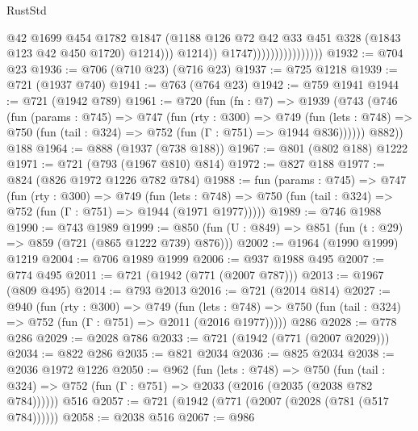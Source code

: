 \begin{lexlean}{RustStd}
\begin{coremodule}
{\begin{coremodule}
{{{{{{{{{{                                            @42
                                            @1699
                                            @454
                                            @1782
                                            @1847
                                            (@1188
                                              @126
                                              @72
                                              @42
                                              @33
                                              @451
                                              @328
                                              (@1843 @123 @42 @450 @1720)
                                              @1214)))
                                        @1214))
                                    @1747))))))))))))))))
@1932 := @704 @23
@1936 := @706 (@710 @23) (@716 @23)
@1937 := @725 @1218
@1939 := @721 (@1937 @740)
@1941 := @763 (@764 @23)
@1942 := @759 @1941
@1944 := @721 (@1942 @789)
@1961 := @720
    (fun (fn : @7) =>
    @1939
      (@743
        (@746
          (fun (params : @745) =>
          @747
            (fun (rty : @300) =>
            @749
              (fun (lets : @748) =>
              @750 (fun (tail : @324) => @752 (fun (Γ : @751) => @1944 @836))))))
        @882))
    @188
@1964 := @888 (@1937 (@738 @188))
@1967 := @801 (@802 @188) @1222
@1971 := @721 (@793 (@1967 @810) @814)
@1972 := @827 @188
@1977 := @824 (@826 @1972 @1226 @782 @784)
@1988 := fun (params : @745) =>
  @747
    (fun (rty : @300) =>
    @749
      (fun (lets : @748) =>
      @750 (fun (tail : @324) => @752 (fun (Γ : @751) => @1944 (@1971 @1977)))))
@1989 := @746 @1988
@1990 := @743 @1989
@1999 := @850 (fun (U : @849) => @851 (fun (t : @29) => @859 (@721 (@865 @1222 @739) @876)))
@2002 := @1964 (@1990 @1999) @1219
@2004 := @706 @1989 @1999
@2006 := @937 @1988 @495
@2007 := @774 @495
@2011 := @721 (@1942 (@771 (@2007 @787)))
@2013 := @1967 (@809 @495)
@2014 := @793 @2013
@2016 := @721 (@2014 @814)
@2027 := @940
    (fun (rty : @300) =>
    @749
      (fun (lets : @748) =>
      @750 (fun (tail : @324) => @752 (fun (Γ : @751) => @2011 (@2016 @1977)))))
    @286
@2028 := @778 @286
@2029 := @2028 @786
@2033 := @721 (@1942 (@771 (@2007 @2029)))
@2034 := @822 @286
@2035 := @821 @2034
@2036 := @825 @2034
@2038 := @2036 @1972 @1226
@2050 := @962
    (fun (lets : @748) =>
    @750 (fun (tail : @324) => @752 (fun (Γ : @751) => @2033 (@2016 (@2035 (@2038 @782 @784))))))
    @516
@2057 := @721 (@1942 (@771 (@2007 (@2028 (@781 (@517 @784))))))
@2058 := @2038 @516
@2067 := @986
}}}}}}}}}}
\end{coremodule}}
\end{coremodule}
\end{lexlean}

